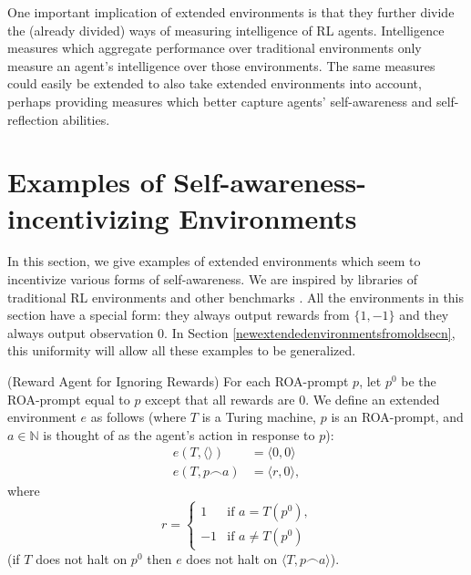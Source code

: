 \documentclass[runningheads]{llncs}
\begin{document}
One important implication of extended environments is that they further divide
the (already divided) ways of measuring intelligence of RL agents. Intelligence
measures
\cite{alexander2019intelligence} \cite{hernandez} \cite{legg2007universal}
which aggregate performance over traditional environments only measure
an agent's intelligence over those environments. The same measures could easily
be extended to also take extended environments into account, perhaps providing
measures which better capture agents' self-awareness and self-reflection abilities.

\section{Examples of Self-awareness-incentivizing Environments}
\label{basicexamplessection}

In this section, we give examples of extended environments which seem
to incentivize various forms of self-awareness. We are inspired by libraries of
traditional RL environments and other benchmarks \cite{bellemare2013arcade}
\cite{beyret2019animal} \cite{brockman2016openai} \cite{chollet2019measure}
\cite{cobbe2020leveraging}. All the environments in this section have a special
form: they always output rewards from $\{1,-1\}$ and they always output observation $0$.
In Section \ref{newextendedenvironmentsfromoldsecn},
this uniformity will allow all these examples to be generalized.

\begin{example}
\label{rewardagentforignoringrewardsexample}
    (Reward Agent for Ignoring Rewards)
    For each ROA-prompt $p$, let $p^0$ be the ROA-prompt equal to $p$ except that
    all rewards are $0$.
    We define an extended environment $e$ as follows
    (where $T$ is a Turing machine, $p$ is an ROA-prompt, and $a\in \mathbb N$ is thought of as
    the agent's action in response to $p$):
    \begin{align*}
        e(T,\langle\rangle) &= \langle 0,0\rangle\\
        e(T,p\frown a)
        &= \langle r,0\rangle,
    \end{align*}
    where
    \[
        r =
        \begin{cases}
            1 & \mbox{if $a=T(p^0)$,}\\
            -1 & \mbox{if $a\not=T(p^0)$}
        \end{cases}
    \]
    (if $T$ does not halt on $p^0$ then $e$ does not halt on
    $\langle T,p\frown a\rangle$).
\end{example}
\end{document}
